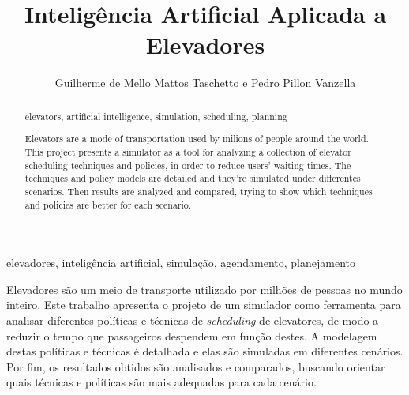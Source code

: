\documentclass[portuguese,oneside]{tcc}
\author{Guilherme de Mello Mattos Taschetto e Pedro Pillon Vanzella}
\title{Inteligência Artificial Aplicada a Elevadores}
      {Artificial Intelligence Applied to Elevators}
\begin{document}
\begin{resumo}{elevadores, inteligência artificial, simulação, agendamento, planejamento}

Elevadores são um meio de transporte utilizado por milhões de pessoas no mundo
inteiro. Este trabalho apresenta o projeto de um simulador como ferramenta para
analisar diferentes políticas e técnicas de \textit{scheduling} de elevatores,
de modo a reduzir o tempo que passageiros despendem em função destes. A
modelagem destas políticas e técnicas é detalhada e elas são simuladas em
diferentes cenários. Por fim, os resultados obtidos são analisados e comparados,
buscando orientar quais técnicas e políticas são mais adequadas para cada
cenário.

\end{resumo}

\begin{abstract}{elevators, artificial intelligence, simulation, scheduling, planning}

Elevators are a mode of transportation used by milions of people around the
world. This project presents a simulator as a tool for analyzing a collection of
elevator scheduling techniques and policies, in order to reduce users' waiting
times. The techniques and policy models are detailed and they're simulated
under differentes scenarios. Then results are analyzed and compared, trying to
show which techniques and policies are better for each scenario.

\end{abstract}

\listoffigures
\listofalgorithms
\tableofcontents

\listoftodos[Notes]













\end{document}
